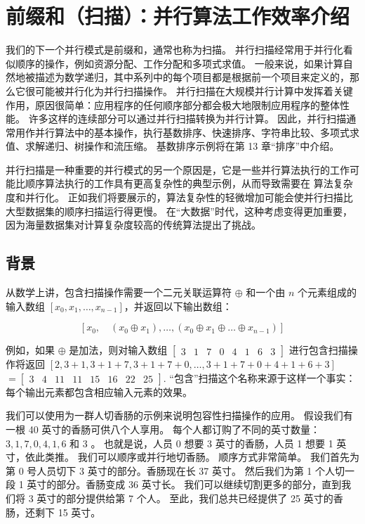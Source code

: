 \section{前缀和（扫描）：并行算法工作效率介绍}
我们的下一个并行模式是前缀和，通常也称为扫描。 并行扫描经常用于并行化看似顺序的操作，例如资源分配、工作分配和多项式求值。 一般来说，如果计算自然地被描述为数学递归，其中系列中的每个项目都是根据前一个项目来定义的，那么它很可能被并行化为并行扫描操作。 并行扫描在大规模并行计算中发挥着关键作用，原因很简单：应用程序的任何顺序部分都会极大地限制应用程序的整体性能。 许多这样的连续部分可以通过并行扫描转换为并行计算。 因此，并行扫描通常用作并行算法中的基本操作，执行基数排序、快速排序、字符串比较、多项式求值、求解递归、树操作和流压缩。 基数排序示例将在第 13 章“排序”中介绍。

并行扫描是一种重要的并行模式的另一个原因是，它是一些并行算法执行的工作可能比顺序算法执行的工作具有更高复杂性的典型示例，从而导致需要在 算法复杂度和并行化。 正如我们将要展示的，算法复杂性的轻微增加可能会使并行扫描比大型数据集的顺序扫描运行得更慢。 在“大数据”时代，这种考虑变得更加重要，因为海量数据集对计算复杂度较高的传统算法提出了挑战。

\subsection{背景}
从数学上讲，包含扫描操作需要一个二元关联运算符 $\oplus$ 和一个由 $n$ 个元素组成的输入数组 $\left[x_{0}, x_{1}, \ldots, x_{n-1}\right] $，并返回以下输出数组：

$$
\left[x_{0}, \quad\left(x_{0} \oplus x_{1}\right), \ldots,\left(x_{0} \oplus x_{1} \oplus \ldots \oplus x_ {n-1}\right)\right]
$$

例如，如果 $\oplus$ 是加法，则对输入数组 $\left[\begin{array}{llllllll}3 & 1 & 7 & 0 & 4 & 1 & 6 & 3\end{array}\right]$ 进行包含扫描操作将返回 $[2,3+1,3+1+7,3+1+7+0, \ldots, 3+1+7+0+4+1+6+3]$ $ =\left[\begin{array}{llllllll}3 & 4 & 11 & 11 & 15 & 16 & 22 & 25\end{array}\right]$. “包含”扫描这个名称来源于这样一个事实：每个输出元素都包含相应输入元素的效果。

我们可以使用为一群人切香肠的示例来说明包容性扫描操作的应用。 假设我们有一根 40 英寸的香肠可供八个人享用。 每个人都订购了不同的英寸数量： $3,1,7,0,4,1,6$ 和 3 。 也就是说，人员 0 想要 3 英寸的香肠，人员 1 想要 1 英寸，依此类推。 我们可以顺序或并行地切香肠。 顺序方式非常简单。 我们首先为第 0 号人员切下 3 英寸的部分。香肠现在长 37 英寸。 然后我们为第 1 个人切一段 1 英寸的部分。香肠变成 36 英寸长。 我们可以继续切割更多的部分，直到我们将 3 英寸的部分提供给第 7 个人。 至此，我们总共已经提供了 25 英寸的香肠，还剩下 15 英寸。


